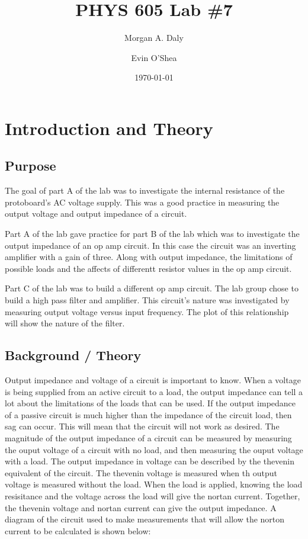 \documentclass[twocolumn, amsmath]{revtex4}
\begin{document}
\title{PHYS 605 Lab \#7} 

\author{Morgan A. Daly}
\author{Evin O'Shea}
\date{\today} 


\maketitle


\section{Introduction and Theory}
\subsection{Purpose}

The goal of part A of the lab was to investigate the internal resistance of the protoboard's AC voltage supply. This was a good practice in measuring the output voltage and output impedance of a circuit. 

Part A of the lab gave practice for part B of the lab which was to investigate the output impedance of an op amp circuit. In this case the circuit was an inverting amplifier with a gain of three. Along with output impedance, the limitations of possible loads and the affects of differentt resistor values in the op amp circuit.

Part C of the lab was to build a different op amp circuit. The lab group chose to build a high pass filter and amplifier. This circuit's nature was investigated by measuring output voltage versus input frequency. The plot of this relationship will show the nature of the filter.

\subsection{Background / Theory}

Output impedance and voltage of a circuit is important to know. When a voltage is being supplied from an active circuit to a load, the output impedance can tell a lot about the limitations of the loads that can be used. If the output impedance of a passive circuit is much higher than the impedance of the circuit load, then sag can occur. This will mean that the circuit will not work as desired. The magnitude of the output impedance of a circuit can be measured by measuring the ouput voltage of a circuit with no load, and then measuring the ouput voltage with a load. The output impedance in voltage can be described by the thevenin equivalent of the circuit. The thevenin voltage is measured when th output voltage is measured without the load. When the load is applied, knowing the load resisitance and the voltage across the load will give the nortan current. Together, the thevenin voltage and nortan current can give the output impedance. A diagram of the circuit used to make measurements that will allow the norton current to be calculated is shown below:
\end{document}
